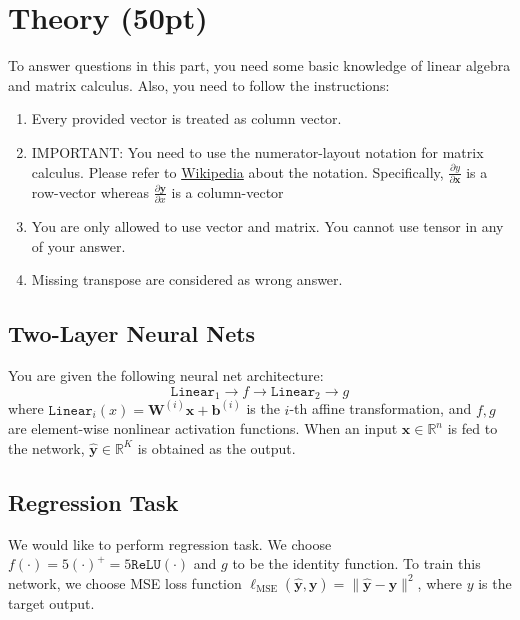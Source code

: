 \documentclass{article}
\newcommand{\R}{\mathbb{R}}	%
\begin{document}
\newpage


\section{Theory (50pt)}

To answer questions in this part, you need some basic knowledge of linear algebra and matrix calculus. Also, you need to follow the instructions:
\begin{enumerate}
\item Every provided vector is treated as column vector.
\item IMPORTANT: You need to use the numerator-layout notation for matrix calculus.
	Please refer to  \href{https://en.wikipedia.org/wiki/Matrix_calculus#Numerator-layout_notation}{Wikipedia} about the notation.
	Specifically, $\frac{\partial{y}}{\partial{\mathbf{x}}}$ is a row-vector whereas $\frac{\partial{\mathbf{y}}}{\partial{x}}$ is a column-vector
\item You are only allowed to use vector and matrix.
You cannot use tensor in any of your answer.
\item Missing transpose are considered as wrong answer.
\end{enumerate}

\subsection{Two-Layer Neural Nets}

You are given the following neural net architecture:
%
\[
\texttt{Linear}_1 \to f \to \texttt{Linear}_2 \to g
\]
%
where $\texttt{Linear}_i (x) = \bm{W}^{(i)}\bm x + \bm b^{(i)}$ is the $i$-th affine transformation, and $f, g$ are element-wise nonlinear activation functions.
When an input $\bm x \in \R^n$ is fed to the network, $ \bm {\hat{y}} \in \R^K$ is obtained as the output.

\subsection{Regression Task}
We would like to perform regression task.
We choose $f(\cdot) = 5 (\cdot)^+ = 5 \texttt{ReLU}(\cdot)$ and $g$ to be the identity function.
To train this network, we choose MSE loss function $\ell_\text{MSE}(\bm{\hat{y}}, \bm{y}) = \| \bm{\hat{y}} - \bm{y} \|^2$, where $y$ is the target output.
\end{document}
